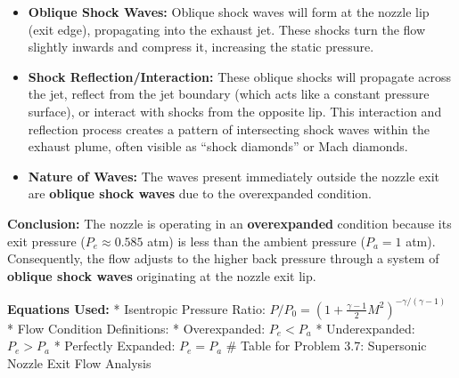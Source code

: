 \begin{enumerate}
  \begin{itemize}
  \tightlist
  \item
    \textbf{Oblique Shock Waves:} Oblique shock waves will form at the
    nozzle lip (exit edge), propagating into the exhaust jet. These
    shocks turn the flow slightly inwards and compress it, increasing
    the static pressure.
  \item
    \textbf{Shock Reflection/Interaction:} These oblique shocks will
    propagate across the jet, reflect from the jet boundary (which acts
    like a constant pressure surface), or interact with shocks from the
    opposite lip. This interaction and reflection process creates a
    pattern of intersecting shock waves within the exhaust plume, often
    visible as ``shock diamonds'' or Mach diamonds.
  \item
    \textbf{Nature of Waves:} The waves present immediately outside the
    nozzle exit are \textbf{oblique shock waves} due to the overexpanded
    condition.
  \end{itemize}
\end{enumerate}

\textbf{Conclusion:} The nozzle is operating in an \textbf{overexpanded}
condition because its exit pressure (\(P_e \approx 0.585\) atm) is less
than the ambient pressure (\(P_a = 1\) atm). Consequently, the flow
adjusts to the higher back pressure through a system of \textbf{oblique
shock waves} originating at the nozzle exit lip.

\textbf{Equations Used:} * Isentropic Pressure Ratio:
\(P/P_0 = (1 + \frac{\gamma-1}{2} M^2)^{-\gamma/(\gamma-1)}\) * Flow
Condition Definitions: * Overexpanded: \(P_e < P_a\) * Underexpanded:
\(P_e > P_a\) * Perfectly Expanded: \(P_e = P_a\) \# Table for Problem
3.7: Supersonic Nozzle Exit Flow Analysis

